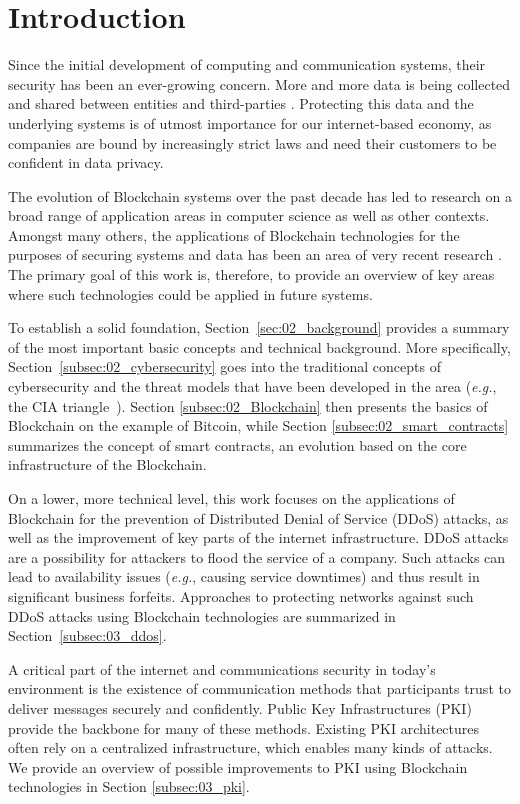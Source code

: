 \section{Introduction}

Since the initial development of computing and communication systems, their security has been an ever-growing concern. More and more data is being collected and shared between entities and third-parties \citep{Plageras2017}. Protecting this data and the underlying systems is of utmost importance for our internet-based economy, as companies are bound by increasingly strict laws and need their customers to be confident in data privacy.

The evolution of Blockchain systems over the past decade has led to research on a broad range of application areas in computer science as well as other contexts. Amongst many others, the applications of Blockchain technologies for the purposes of securing systems and data has been an area of very recent research \citep{Huckle2016}. The primary goal of this work is, therefore, to provide an overview of key areas where such technologies could be applied in future systems.

To establish a solid foundation, Section~\ref{sec:02_background} provides a summary of the most important basic concepts and technical background. More specifically, Section~\ref{subsec:02_cybersecurity} goes into the traditional concepts of cybersecurity and the threat models that have been developed in the area (\textit{e.g.}, the CIA triangle~\cite{whitman2011principles}). Section \ref{subsec:02_Blockchain} then presents the basics of Blockchain on the example of Bitcoin, while Section \ref{subsec:02_smart_contracts} summarizes the concept of smart contracts, an evolution based on the core infrastructure of the Blockchain.

On a lower, more technical level, this work focuses on the applications of Blockchain for the prevention of Distributed Denial of Service (DDoS) attacks, as well as the improvement of key parts of the internet infrastructure. DDoS attacks are a possibility for attackers to flood the service of a company. Such attacks can lead to availability issues (\textit{e.g.}, causing service downtimes) and thus result in significant business forfeits. Approaches to protecting networks against such DDoS attacks using Blockchain technologies are summarized in Section~\ref{subsec:03_ddos}.

A critical part of the internet and communications security in today's environment is the existence of communication methods that participants trust to deliver messages securely and confidently. Public Key Infrastructures (PKI) provide the backbone for many of these methods. Existing PKI architectures often rely on a centralized infrastructure, which enables many kinds of attacks. We provide an overview of possible improvements to PKI using Blockchain technologies in Section \ref{subsec:03_pki}.

